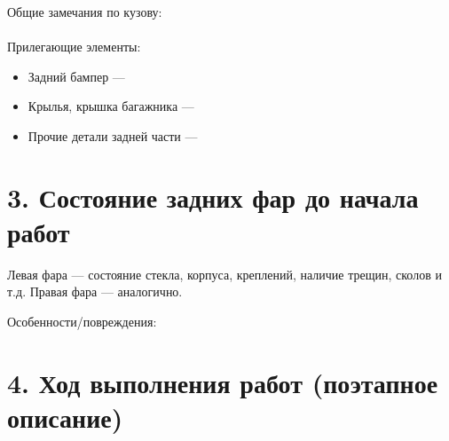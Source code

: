 \vspace{0.5em}

Общие замечания по кузову:  
\underline{\hspace{\textwidth}}\\[0.5em]
\underline{\hspace{\textwidth}}\\[0.5em]

Прилегающие элементы:
\begin{itemize}[noitemsep,topsep=0pt]
	\item Задний бампер — \underline{\hspace{10cm}}
	\item Крылья, крышка багажника — \underline{\hspace{8cm}}
	\item Прочие детали задней части — \underline{\hspace{7cm}}
\end{itemize}


\vspace{1em}

\section*{3. Состояние задних фар до начала работ}

Левая фара — состояние стекла, корпуса, креплений, наличие трещин, сколов и т.д.  
Правая фара — аналогично.  

Особенности/повреждения:  
\underline{\hspace{\textwidth}}\\[0.5em]
\underline{\hspace{\textwidth}}


\vspace{1em}

\section*{4. Ход выполнения работ (поэтапное описание)}

